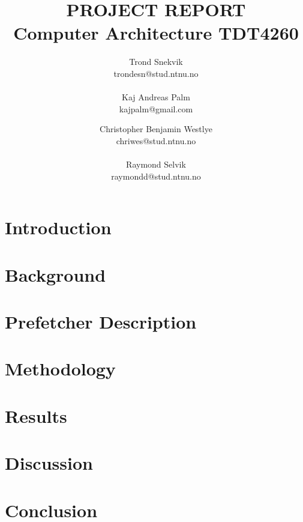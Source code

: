 \documentclass[a4paper]{report}
\author{Trond Snekvik\\ trondesn@stud.ntnu.no\\\\ Kaj Andreas Palm \\kajpalm@gmail.com\and Christopher Benjamin Westlye\\ chriwes@stud.ntnu.no\\\\ Raymond Selvik\\ raymondd@stud.ntnu.no}
\title{\MakeUppercase{\bf Project report} \\ \Large{Computer Architecture TDT4260}}
\date{}
\begin{document}
\maketitle


\tableofcontents
\pagestyle{plain} %

\begin{abstract}

\end{abstract}

\newpage
\chapter{Introduction}


\newpage
\chapter{Background}


\newpage
\chapter{Prefetcher Description}


\newpage
\chapter{Methodology}


\newpage
\chapter{Results}


\newpage
\chapter{Discussion}


\newpage
\chapter{Conclusion}

\end{document}
